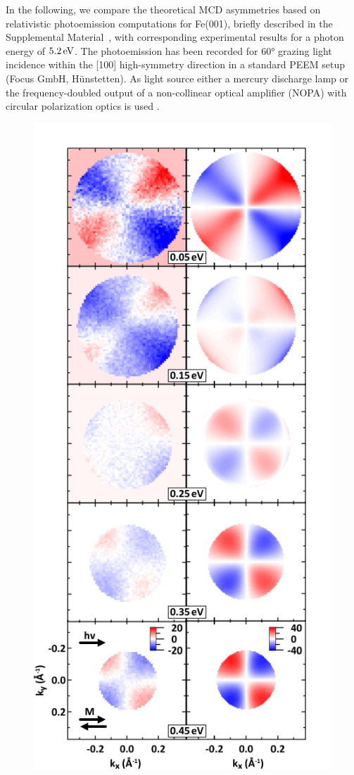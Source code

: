 \documentclass[prl,twocolumn,floatfix]{revtex4-2}
\begin{document}
In the following, we compare the theoretical MCD asymmetries based on relativistic photoemission computations for Fe(001), briefly described in the Supplemental Material~\cite{Supplement}, with corresponding experimental results for a photon energy of $\unit[5.2]{eV}$. The photoemission has been recorded for 60° grazing light incidence within the [100] high-symmetry direction in a standard PEEM setup (Focus GmbH, Hünstetten). As light source either a mercury discharge lamp or the frequency-doubled output of a non-collinear optical amplifier (NOPA) with circular polarization optics is used \cite{duncker2012,gillmeister2020, paleschke2021}. 

\begin{figure}
    \centering
    \includegraphics[width = 0.7\columnwidth]{FePaperApol.pdf}

\end{figure}
\end{document}
